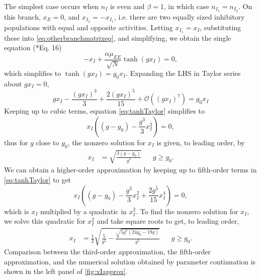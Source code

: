 \documentclass[11pt,reqno]{amsart}
\begin{document}
The simplest case occurs when $n_I$ is even and $\beta = 1$, in which case $n_{I_1}=n_{I_2}$. On this branch, $x_E = 0$, and $x_{I_2} = -x_{I_1}$, i.e. there are two equally sized inhibitory populations with equal and opposite activities. Letting $x_{I_1} = x_I$, substituting these into \cref{eq:otherbranchmatrixeq}, and simplifying, we obtain the single equation (\cite{Barreiro2017}*{Eq. 16})
\[
-x_I + \frac{\alpha \mu_{EE} }{\sqrt{N}} \tanh(g x_I) = 0, 
\]
which simplifies to $\tanh(g x_I) = g_0 x_I$. Expanding the LHS in Taylor series about $g x_I = 0$,
\begin{equation}\label{eq:tanhTaylor}
g x_I - \frac{(g x_I)^3}{3} + \frac{2(g x_I)^5}{15} + \mathcal{O}\left( (g x_I)^7 \right) = g_0 x_I
\end{equation}
Keeping up to cubic terms, equation \cref{eq:tanhTaylor} simplifies to
\[
x_I \left( (g - g_0) - \frac{g^3}{3} x_I^2 \right) = 0,
\]
thus for $g$ close to $g_0$, the nonzero solution for $x_I$ is given, to leading order, by
\begin{align}\label{eq:xIapprox}
x_I &= \sqrt{ \frac{3(g - g_0) }{g^3}} && g \geq g_0.
\end{align}
We can obtain a higher-order approximation by keeping up to fifth-order terms in \cref{eq:tanhTaylor} to get
\begin{equation*}
x_I \left( (g - g_0) - \frac{g^3}{3} x_I^2 + \frac{2 g^5}{15} x_I^4 \right) = 0,
\end{equation*}
which is $x_I$ multiplied by a quadratic in $x_I^2$. To find the nonzero solution for $x_I$, we solve this quadratic for $x_I^2$ and take square roots to get, to leading order,
\begin{align}\label{eq:xIapprox5}
x_I &= \frac{1}{2} \sqrt{ \frac{5}{g^2} - \frac{\sqrt{ 5 g^5( 24 g_0 - 19 g) }}{g^5}} && g \geq g_0.
\end{align}
Comparison between the third-order approximation, the fifth-order approximation, and the numerical solution obtained by parameter continuation is shown in the left panel of \cref{fig:xIapprox}.
\end{document}

